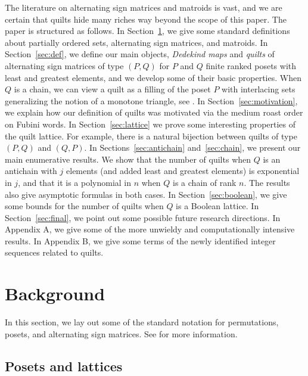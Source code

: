 \documentclass[12pt]{amsart}
\numberwithin{equation}{section}
\theoremstyle{definition}
\begin{document}
The literature on alternating sign matrices and matroids is vast, and
we are certain that quilts hide many riches way beyond the scope of
this paper.  The paper is structured as follows. In
Section~\ref{sec:background}, we give some standard definitions about
partially ordered sets, alternating sign matrices, and matroids. In
Section~\ref{sec:def}, we define our main objects, \emph{Dedekind
maps} and   \emph{quilts} of
alternating sign matrices of type $(P,Q)$ for $P$ and $Q$ finite
ranked posets with least and greatest elements, and we develop some of
their basic properties. When $Q$ is a chain, we can view a quilt as a
filling of the poset $P$ with interlacing sets generalizing the notion
of a monotone triangle, see .  In
Section~\ref{sec:motivation}, we explain how our definition of quilts
was motivated via the medium roast order on Fubini words. In
Section~\ref{sec:lattice} we prove some interesting properties of the
quilt lattice.  For example, there is a natural bijection between
quilts of type $(P,Q)$ and $(Q,P)$. In Sections~\ref{sec:antichain}
and~\ref{sec:chain}, we present our main enumerative results. We show
that the number of quilts when $Q$ is an antichain with $j$ elements
(and added least and greatest elements) is exponential in $j$, and
that it is a polynomial in $n$ when $Q$ is a chain of rank $n$. The
results also give asymptotic formulas in both cases. In
Section~\ref{sec:boolean}, we give some bounds for the number of
quilts when $Q$ is a Boolean lattice. In Section~\ref{sec:final}, we
point out some possible future research directions. In Appendix A, we
give some of the more unwieldy and computationally intensive
results. In Appendix B, we give some terms of the newly identified
integer sequences related to quilts.

\section{Background} \label{sec:background}

In this section, we lay out some of the standard notation for
permutations, posets, and alternating sign matrices.  See \cite{ec1}
for more information.


\subsection{Posets and lattices}
\end{document}
